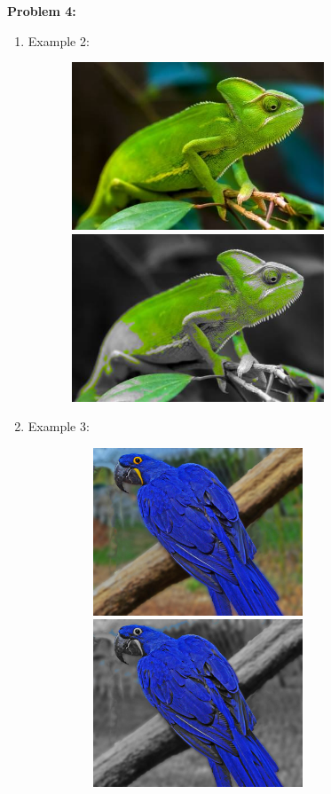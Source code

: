 \documentclass[11pt]{article}
\newenvironment{problem}[1]{\textbf{Problem #1: }}{\newpage}
\begin{document}
\begin{problem}{4}
\begin{enumerate}
\begin{figure}[h!]
			\end{figure}
			\item Example 2:
			\begin{figure}[h!]
				\includegraphics[width = 8cm, height = 5cm]{../Photos/Test2.jpg}
				\hspace{.75cm}
				\includegraphics[width = 8cm, height = 5cm]{../Photos/Test2Results.jpg}
			\end{figure}
			\item Example 3:
			\begin{figure}[h!]
				\includegraphics[width = 8cm, height = 5cm]{../Photos/Test3.jpg}
				\hspace{.75cm}
				\includegraphics[width = 8cm, height = 5cm]{../Photos/Test3Results.jpg}
			\end{figure}
		\end{enumerate}
		
	\end{problem}
\end{document}

